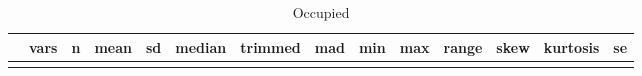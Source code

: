 \documentclass[
]{article}
\begin{document}
\begin{longtable}[]{@{}lrrrrrrrrrrrrr@{}}
\caption{Occupied}\tabularnewline
\toprule
\begin{minipage}[b]{0.08\columnwidth}\raggedright
\strut
\end{minipage} & \begin{minipage}[b]{0.03\columnwidth}\raggedleft
vars\strut
\end{minipage} & \begin{minipage}[b]{0.03\columnwidth}\raggedleft
n\strut
\end{minipage} & \begin{minipage}[b]{0.05\columnwidth}\raggedleft
mean\strut
\end{minipage} & \begin{minipage}[b]{0.05\columnwidth}\raggedleft
sd\strut
\end{minipage} & \begin{minipage}[b]{0.05\columnwidth}\raggedleft
median\strut
\end{minipage} & \begin{minipage}[b]{0.05\columnwidth}\raggedleft
trimmed\strut
\end{minipage} & \begin{minipage}[b]{0.05\columnwidth}\raggedleft
mad\strut
\end{minipage} & \begin{minipage}[b]{0.05\columnwidth}\raggedleft
min\strut
\end{minipage} & \begin{minipage}[b]{0.05\columnwidth}\raggedleft
max\strut
\end{minipage} & \begin{minipage}[b]{0.05\columnwidth}\raggedleft
range\strut
\end{minipage} & \begin{minipage}[b]{0.04\columnwidth}\raggedleft
skew\strut
\end{minipage} & \begin{minipage}[b]{0.05\columnwidth}\raggedleft
kurtosis\strut
\end{minipage} & \begin{minipage}[b]{0.03\columnwidth}\raggedleft
se\strut
\end{minipage}\tabularnewline
\midrule
\endfirsthead
\toprule
\begin{minipage}[b]{0.08\columnwidth}\raggedright
\strut
\end{minipage} & \begin{minipage}[b]{0.03\columnwidth}\raggedleft

\end{minipage}
\end{longtable}
\end{document}
